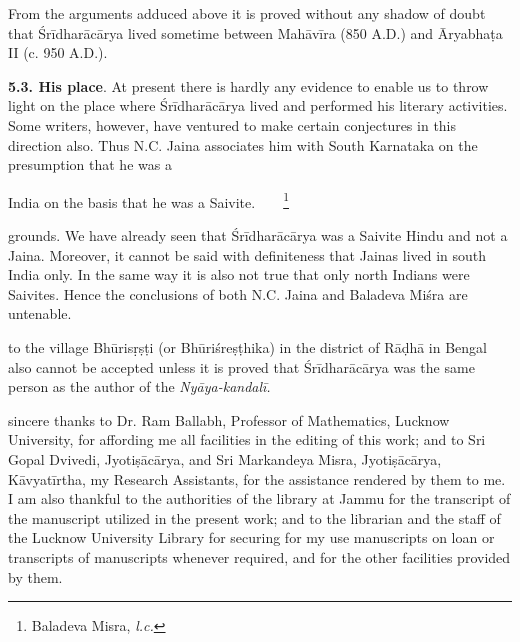 \documentclass[10pt, openany]{book}
\begin{document}
{From the arguments adduced above it is proved without}
{any shadow of doubt that Śrīdharācārya lived sometime}
{between Mahāvīra (850 A.D.) and Āryabhaṭa II (c. 950 A.D.).} 
\vspace{4mm}

{\textbf{5.3. His place}. At present there is hardly any}
{evidence to enable us to throw light on the place where}
{Śrīdharācārya lived and performed his literary activities.}
{Some writers, however, have ventured to make certain conjectures in this direction also. Thus N.C. Jaina associates}
{him with South Karnataka on the presumption that he was a}

\newpage

\justify\englishfont{}
India on the basis that he was a Saivite.~~~~\renewcommand{\thefootnote}{\hspace{-4.5mm} 2}\footnote{\hspace{-2mm} \englishfont Baladeva Misra, \textit{l.c.}}

\vspace{0.3cm}{Both the above conjectures are based on fallacious} 
{grounds. We have already seen that Śrīdharācārya was a}
{Saivite Hindu and not a Jaina. Moreover, it cannot be said}
{with definiteness that Jainas lived in south India only. In}
{the same way it is also not true that only north Indians}
{were Saivites. Hence the conclusions of both N.C. Jaina and}
{Baladeva Miśra are untenable.}

\vspace{0.3cm}{Sudhākara Dvivedi's opinion that Śrīdharācārya belonged}
{to the village Bhūrisṛṣṭi (or Bhūriśreṣṭhika) in the district of}
{Rāḍhā in Bengal also cannot be accepted unless it is proved}
{that Śrīdharācārya was the same person as the author of the}
\textit{Nyāya-kandalī.}

\vspace{0.3cm}{6. In the end I have great pleasure in expressing my}
{sincere thanks to Dr. Ram Ballabh, Professor of Mathematics,}
{Lucknow University, for affording me all facilities in the}
{editing of this work; and to Sri Gopal Dvivedi, Jyotiṣācārya,}
{and Sri Markandeya Misra, Jyotiṣācārya, Kāvyatīrtha, my}
{Research Assistants, for the assistance rendered by them to}
{me. I am also thankful to the authorities of the library at}
{Jammu for the transcript of the manuscript utilized in}
{the present work; and to the librarian and the staff}
{of the Lucknow University Library for securing for my}
{use manuscripts on loan or transcripts of manuscripts whenever required, and for the other facilities provided by them.}
\end{document}
